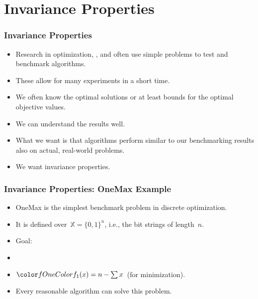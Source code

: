 \documentclass[aspectratio=169,mathserif,notheorems]{beamer}%
\gdef\searchSpace{\ensuremath{\mathbb{X}}}%
\begin{document}
\section{Invariance Properties}%
%
\begin{frame}%
\frametitle{Invariance Properties}%
\begin{itemize}%
\item Research in optimization, , and  often use simple problems to test and benchmark algorithms.%
\item<2-> These allow for many experiments in a short time.%
\item<3-> We often know the optimal solutions or at least bounds for the optimal objective values.%
\item<4-> We can understand the results well.%
\item<5-> What we want is that algorithms perform similar to our benchmarking results also on actual, real-world problems.%
\item<6-> \alert{We want invariance properties.}\cite{OAAH2017IGOAAUPVIP,HA2014PDOCSSFTTP,JA2010LLCOTSIMMLEAOMFIRFLPS}%
\end{itemize}%
\end{frame}%
%
%
\begin{frame}%
\frametitle{Invariance Properties: OneMax Example}%
\parbox{0.415\paperwidth}{%
\begin{itemize}%
\item OneMax is the simplest benchmark problem in discrete optimization\cite{M1992HGARWMAH}.%
\item<2-> It is defined over~$\searchSpace=\{0,1\}^n$, i.e., the bit strings of length~$n$.%
\item<3-> Goal:~%
\item<4-> %
\item<5-> $\fn{1}(x)=n-\sum{x}$~(for minimization).%
\item<6-> Every reasonable algorithm can solve this problem.%
\end{itemize}%
}%
%
%
%
\end{frame}%
%
%
\end{document}

